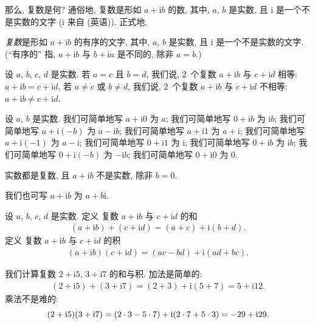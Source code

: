 \documentclass[../libro.tex]{subfiles}
\begin{document}
那么, 复数是何?
通俗地, 复数是形如 \(a + \mathrm{i} b\) 的数,
其中, \(a\), \(b\) 是实数,
且 \(\mathrm{i}\) 是一个不是实数的文字
(\(\mathrm{i}\) 来自  (英语)).
正式地,

\begin{definition}
    \emph{复数}是形如 \(a + \mathrm{i} b\) 的有序的文字,
    其中, \(a\), \(b\) 是实数,
    且 \(\mathrm{i}\) 是一个不是实数的文字.
    (``有序的'' 指, %
    \(a + \mathrm{i} b\) 与 \(b + \mathrm{i} a\)
    是不同的, 除非 \(a = b\).) %

    设 \(a\), \(b\), \(c\), \(d\) 是实数.
    若 \(a = c\) 且 \(b = d\),
    我们说, \(2\)~个复数
    \(a + \mathrm{i} b\) 与 \(c + \mathrm{i} d\)
    相等:
    \(a + \mathrm{i} b = c + \mathrm{i} d\).
    若 \(a \neq c\) 或 \(b \neq d\),
    我们说, \(2\)~个复数
    \(a + \mathrm{i} b\) 与 \(c + \mathrm{i} d\)
    不相等:
    \(a + \mathrm{i} b \neq c + \mathrm{i} d\).

    设 \(a\), \(b\) 是实数.
    我们可简单地写 \(a + \mathrm{i} 0\) 为 \(a\);
    我们可简单地写 \(0 + \mathrm{i} b\) 为 \(\mathrm{i} b\);
    我们可简单地写 \(a + \mathrm{i} (-b)\) 为
    \(a - \mathrm{i} b\);
    我们可简单地写 \(a + \mathrm{i} 1\) 为
    \(a + \mathrm{i}\);
    我们可简单地写 \(a + \mathrm{i} (-1)\) 为
    \(a - \mathrm{i}\);
    我们可简单地写 \(0 + \mathrm{i} 1\) 为
    \(\mathrm{i}\);
    我们可简单地写 \(0 + \mathrm{i} b\) 为
    \(\mathrm{i} b\);
    我们可简单地写 \(0 + \mathrm{i} (-b)\) 为
    \(-\mathrm{i} b\);
    我们可简单地写 \(0 + \mathrm{i} 0\) 为
    \(0\).

    实数都是复数,
    且 \(a + \mathrm{i} b\) 不是实数,
    除非 \(b = 0\).

    我们也可写 \(a + \mathrm{i} b\)
    为 \(a + b \mathrm{i}\).

    设 \(a\), \(b\), \(c\), \(d\) 是实数.
    定义%
    复数 \(a + \mathrm{i} b\) 与 \(c + \mathrm{i} d\) 的和
    \begin{align*}
        (a + \mathrm{i} b) + (c + \mathrm{i} d)
        = (a + c) + \mathrm{i} (b + d).
    \end{align*}
    定义%
    复数 \(a + \mathrm{i} b\) 与 \(c + \mathrm{i} d\) 的积
    \begin{align*}
        (a + \mathrm{i} b) (c + \mathrm{i} d)
        = (a c - b d) + \mathrm{i} (a d + b c).
    \end{align*}
\end{definition}

\begin{example}
    我们计算复数
    \(2 + \mathrm{i} 5\), \(3 + \mathrm{i} 7\)
    的和与积.
    加法是简单的:
    \begin{align*}
        (2 + \mathrm{i} 5) + (3 + \mathrm{i} 7)
        = (2 + 3) + \mathrm{i} (5 + 7)
        = 5 + \mathrm{i} 12.
    \end{align*}
    乘法不是难的:
    \begin{equation*}
        (2 + \mathrm{i} 5) (3 + \mathrm{i} 7)
        = (2 \cdot 3 - 5 \cdot 7)
        + \mathrm{i} (2 \cdot 7 + 5 \cdot 3)
        = -29 + \mathrm{i} 29.
        \qedhere
    \end{equation*}
\end{example}
\end{document}
